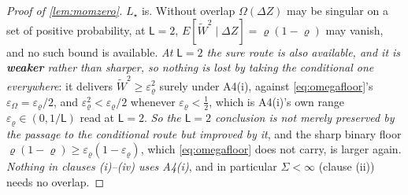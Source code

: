 \begin{proof}[Proof of \cref{lem:momzero}]
$L_\star$ is. Without overlap $\Omega(\Delta Z)$ may be singular on a set of positive probability, 
at $\mathsf L=2$, $E[\widetilde W^{2}\mid\Delta Z]=\varrho(1-\varrho)$ may vanish, and no
such bound is available.
\emph{At $\mathsf L=2$ the sure route is also available, and it is \textbf{weaker} rather than sharper,
so nothing is lost by taking the conditional one everywhere}: it delivers
$\widetilde W^{2}\ge\varepsilon_\varrho^{2}$ surely under A4(i), against \eqref{eq:omegafloor}'s
$\varepsilon_\Omega=\varepsilon_\varrho/2$, and
$\varepsilon_\varrho^{2}<\varepsilon_\varrho/2$ whenever $\varepsilon_\varrho<\tfrac12$, which is
A4(i)'s own range $\varepsilon_\varrho\in(0,1/\mathsf L)$ read at $\mathsf L=2$. \emph{So the
$\mathsf L=2$ conclusion is not merely preserved by the passage to the conditional route but improved by
it}, and the sharp binary floor $\varrho(1-\varrho)\ge\varepsilon_\varrho(1-\varepsilon_\varrho)$, which
\eqref{eq:omegafloor} does not carry, is larger again.
\emph{Nothing in clauses \textup{(i)}--\textup{(iv)} uses A4(i)}, and in
particular $\Sigma<\infty$ (clause (ii)) needs no overlap.


\end{proof}
